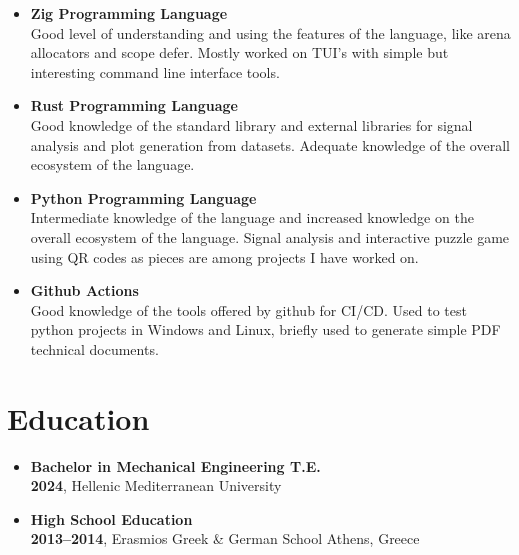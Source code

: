 \documentclass[a4paper,9pt]{extarticle}
\begin{document}
\begin{itemize}
\item{\textbf{Zig Programming Language}} \\
        \noindent
        Good level of understanding and using the features of the language, like arena allocators and
        scope defer. Mostly worked on TUI's with simple but interesting command line interface tools.\\

\item{\textbf{Rust Programming Language}} \\
        \noindent
        Good knowledge of the standard library and external libraries for signal
        analysis and plot generation from datasets. Adequate knowledge of the
        overall ecosystem of the language.\\

\item{\textbf{Python Programming Language}} \\
        \noindent
        Intermediate knowledge of the language and increased knowledge on the
        overall ecosystem of the language. Signal analysis and interactive puzzle
        game using QR codes as pieces are among projects I have worked on.\\

\item{\textbf{Github Actions}} \\
        \noindent
        Good knowledge of the tools offered by github for CI/CD. Used to test python projects
        in Windows and Linux, briefly used to generate simple PDF technical documents.\\
\end{itemize}

\section*{Education}

\noindent
\begin{itemize}
  \item{\textbf{Bachelor in Mechanical Engineering T.E.}} \\
        \textbf{2024}, Hellenic Mediterranean University \\
\noindent
  \item{\textbf{High School Education}} \\
        \textbf{2013--2014}, Erasmios Greek \& German School Athens, Greece \\
\end{itemize}
\end{document}
